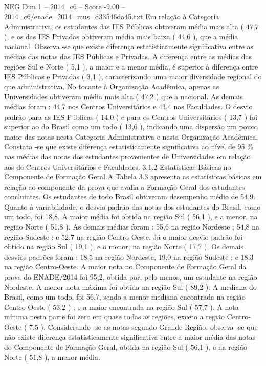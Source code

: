 \begin{textsample}{NEG Dim 1 – 2014\_c6 – Score -9.00 – 2014\_c6/enade\_2014\_mus\_d33546da45.txt}
Em relação à Categoria Administrativa, os estudantes das IES Públicas obtiveram média mais alta ( 47,7 ), e os das IES Privadas obtiveram média mais baixa ( 44,6 ), que a média nacional.
Observa -se que existe diferença estatisticamente significativa entre as médias das notas das IES Públicas e Privadas.
A diferença entre as médias das regiões Sul e Norte ( 5,1 ), a maior e a menor média, é superior à diferença entre IES Públicas e Privadas ( 3,1 ), caracterizando uma maior diversidade regional do que administrativa.
No tocante à Organização Acadêmica, apenas as Universidades obtiveram média mais alta ( 47,2 ) que a nacional.
As demais médias foram : 44,7 nos Centros Universitários e 43,4 nas Faculdades.
O desvio padrão para as IES Públicas ( 14,0 ) e para os Centros Universitários ( 13,7 ) foi superior ao do Brasil como um todo ( 13,6 ), indicando uma dispersão um pouco maior das notas nesta Categoria Administrativa e nesta Organização Acadêmica.
Constata -se que existe diferença estatisticamente significativa ao nível de 95 \% nas médias das notas dos estudantes provenientes de Universidades em relação aos de Centros Universitários e Faculdades. 3.1.2 Estatísticas Básicas no Componente de Formação Geral A Tabela 3.3 apresenta as estatísticas básicas em relação ao componente da prova que avalia a Formação Geral dos estudantes concluintes.
Os estudantes de todo Brasil obtiveram desempenho médio de 54,9.
Quanto à variabilidade, o desvio padrão das notas dos estudantes do Brasil, como um todo, foi 18,8.
A maior média foi obtida na região Sul ( 56,1 ), e a menor, na região Norte ( 51,8 ).
As demais médias foram : 55,6 na região Nordeste ; 54,8 na região Sudeste ; e 52,7 na região Centro-Oeste.
Já o maior desvio padrão foi obtido na região Sul ( 19,1 ), e o menor, na região Norte ( 17,7 ).
Os demais desvios padrões foram : 18,5 na região Nordeste, 19,0 na região Sudeste ; e 18,3 na região Centro-Oeste.
A maior nota no Componente de Formação Geral da prova do ENADE/2014 foi 95,2, obtida por, pelo menos, um estudante na região Nordeste.
A menor nota máxima foi obtida na região Sul ( 89,2 ).
A mediana do Brasil, como um todo, foi 56,7, sendo a menor mediana encontrada na região Centro-Oeste ( 53,2 ) ; e a maior encontrada na região Sul ( 57,7 ).
A nota mínima nesta parte foi zero em quase todas as regiões, exceto a região Centro-Oeste ( 7,5 ).
Considerando -se as notas segundo Grande Região, observa -se que não existe diferença estatisticamente significativa entre a maior média das notas do Componente de Formação Geral, obtida na região Sul ( 56,1 ), e na região Norte ( 51,8 ), a menor média.

\end{textsample}

